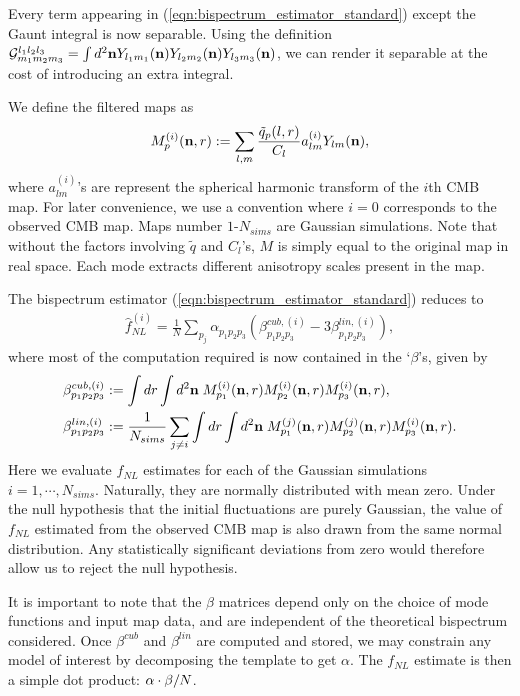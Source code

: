 Every term appearing in (\ref{eqn:bispectrum_estimator_standard}) except the Gaunt integral is now separable. Using the definition $\mathcal{G}^{l_1 l_2 l_3}_{m_1 m_2 m_3} = \int d^2 \mathbf{n} Y_{l_1 m_1}(\mathbf{n}) Y_{l_2 m_2}(\mathbf{n}) Y_{l_3 m_3}(\mathbf{n})$, we can render it separable at the cost of introducing an extra integral.

We define the filtered maps as
\begin{align}
	M^{(i)}_p (\mathbf{n}, r) := \sum_{l,m} \frac{\tilde{q}_p (l,r)}{C_l} a^{(i)}_{lm} Y_{lm} (\mathbf{n}), \label{def:filtered_maps}
\end{align}
where $a^{(i)}_{lm}$'s are represent the spherical harmonic transform of the $i$th CMB map. For later convenience, we use a convention where $i=0$ corresponds to the observed CMB map. Maps number $1$-$N_{sims}$ are Gaussian simulations. Note that without the factors involving $\tilde{q}$ and $C_l$'s, $M$ is simply equal to the original map in real space. Each mode extracts different anisotropy scales present in the map.

The bispectrum estimator (\ref{eqn:bispectrum_estimator_standard}) reduces to
\begin{align}
	\hat{f}_{NL}^{(i)} = \frac{1}{N} \sum_{p_j} \alpha_{p_1 p_2 p_3} (\beta^{cub,(i)}_{p_1 p_2 p_3} - 3 \beta^{lin,(i)}_{p_1 p_2 p_3}), \label{eqn:fNL_from_betas}
\end{align}
where most of the computation required is now contained in the `$\beta$'s, given by
\begin{align}
	\beta^{cub,(i)}_{p_1 p_2 p_3} &:= \int dr \int d^2\mathbf{n} \; M^{(i)}_{p_1} (\mathbf{n},r) M^{(i)}_{p_2} (\mathbf{n},r) M^{(i)}_{p_3} (\mathbf{n},r),	\label{def:beta_cubic} \\
	\beta^{lin,(i)}_{p_1 p_2 p_3} &:= \frac{1}{N_{sims}} \sum_{j \neq i} \int dr \int d^2\mathbf{n} \; M^{(j)}_{p_1} (\mathbf{n},r) M^{(j)}_{p_2} (\mathbf{n},r) M^{(i)}_{p_3} (\mathbf{n},r). \label{def:beta_linear}
\end{align}
Here we evaluate $f_{NL}$ estimates for each of the Gaussian simulations $i=1,\cdots,N_{sims}$. Naturally, they are normally distributed with mean zero. Under the null hypothesis that the initial fluctuations are purely Gaussian, the value of $f_{NL}$ estimated from the observed CMB map is also drawn from the same normal distribution. Any statistically significant deviations from zero would therefore allow us to reject the null hypothesis.

It is important to note that the $\beta$ matrices depend only on the choice of mode functions and input map data, and are independent of the theoretical bispectrum considered. Once $\beta^{cub}$ and $\beta^{lin}$ are computed and stored, we may constrain any model of interest by decomposing the template to get $\alpha$. The $f_{NL}$ estimate is then  a simple dot product: $\mathbf{\alpha} \cdot \mathbf{\beta} / N$.


